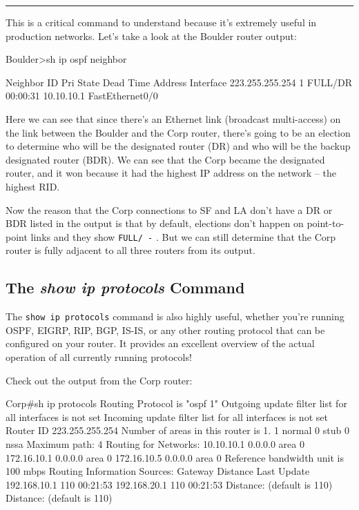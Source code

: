 \begin{center}\rule{0.5\linewidth}{0.5pt}\end{center}

This is a critical command to understand because it's extremely useful
in production networks. Let's take a look at the Boulder router output:

\begin{cli}
Boulder>sh ip ospf neighbor

Neighbor ID     Pri   State    Dead Time   Address         Interface
223.255.255.254   1   FULL/DR  00:00:31    10.10.10.1      FastEthernet0/0
\end{cli}

Here we can see that since there's an Ethernet link (broadcast
multi-access) on the link between the Boulder and the Corp router,
there's going to be an election to determine who will be the designated
router (DR) and who will be the backup designated router (BDR). We can
see that the Corp became the designated router, and it won because it
had the highest IP address on the network -- the highest RID.

Now the reason that the Corp connections to SF and LA don't have a DR or
BDR listed in the output is that by default, elections don't happen on
point-to-point links and they show \texttt{FULL/\ -} . But we can still
determine that the Corp router is fully adjacent to all three routers
from its output.

\subsection[The \emph{show ip protocols}
Command]{\texorpdfstring{\protect\hypertarget{c18.xhtmlux5cux23c18-sec-16}{}{}The
\emph{show ip protocols} Command}{The show ip protocols Command}}

The \texttt{show\ ip\ protocols} command is also highly useful, whether
you're running OSPF, EIGRP, RIP, BGP, IS-IS, or any other routing
protocol that can be configured on your router. It provides an excellent
overview of the actual operation of all currently running protocols!

Check out the output from the Corp router:

\begin{cli}
Corp#sh ip protocols
Routing Protocol is "ospf 1"
  Outgoing update filter list for all interfaces is not set
  Incoming update filter list for all interfaces is not set
  Router ID 223.255.255.254
  Number of areas in this router is 1. 1 normal 0 stub 0 nssa
  Maximum path: 4
  Routing for Networks:
    10.10.10.1 0.0.0.0 area 0
    172.16.10.1 0.0.0.0 area 0
    172.16.10.5 0.0.0.0 area 0
 Reference bandwidth unit is 100 mbps
  Routing Information Sources:
    Gateway         Distance      Last Update
    192.168.10.1         110      00:21:53
    192.168.20.1         110      00:21:53
  Distance: (default is 110) Distance: (default is 110)
\end{cli}

